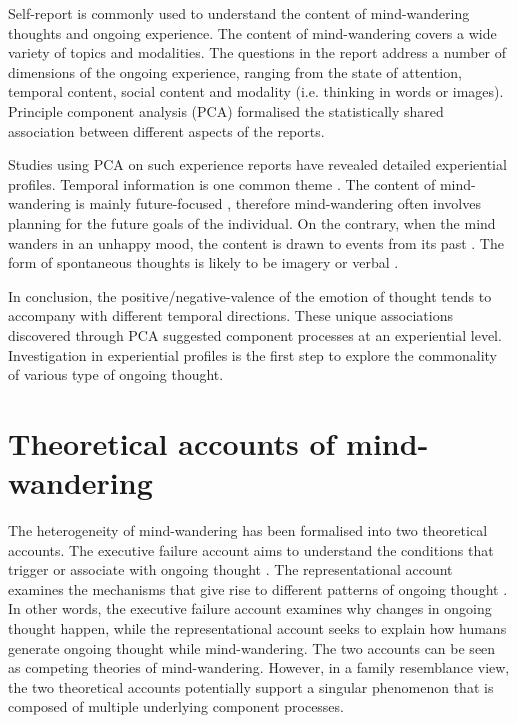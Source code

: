 Self-report is commonly used to understand the content of mind-wandering thoughts and ongoing experience. The content of mind-wandering covers a wide variety of topics and modalities. The questions in the report address a number of dimensions of the ongoing experience, ranging from the state of attention, temporal content, social content and modality (i.e. thinking in words or images). Principle component analysis (PCA) formalised the statistically shared association between different aspects of the reports. 

Studies using PCA on such experience reports have revealed detailed experiential profiles. Temporal information is one common theme \cite{RubyFP2013,RubyPlos2013}. The content of mind-wandering is mainly future-focused \cite{Baird2011}, therefore mind-wandering often involves planning for the future goals of the individual. On the contrary, when the mind wanders in an unhappy mood, the content is drawn to events from its past \cite{Smallwood2011}. The form of spontaneous thoughts is likely to be imagery or verbal \cite{Gorgolewski2014,Smallwood2016}. 

In conclusion, the positive/negative-valence of the emotion of thought tends to accompany with different temporal directions. These unique associations discovered through PCA suggested component processes at an experiential level. Investigation in experiential profiles is the first step to explore the commonality of various type of ongoing thought. 


\section{Theoretical accounts of mind-wandering}
\label{ch:intro:accounts}

The heterogeneity of mind-wandering has been formalised into two theoretical accounts. The executive failure account aims to understand the conditions that trigger or associate with ongoing thought \cite{Kane2012,McVay2010}. The representational account examines the mechanisms that give rise to different patterns of ongoing thought \cite{Smallwood2016}. In other words, the executive failure account examines why changes in ongoing thought happen, while the representational account seeks to explain how humans generate ongoing thought while mind-wandering. The two accounts can be seen as competing theories of mind-wandering. However, in a family resemblance view, the two theoretical accounts potentially support a singular phenomenon that is composed of multiple underlying component processes. 

